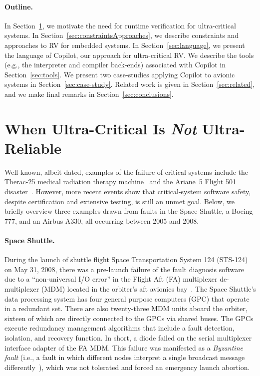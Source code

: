 \paragraph{Outline.}  In Section~\ref{sec:motivation}, we motivate the need for
runtime verification for ultra-critical systems.  In
Section~\ref{sec:constraintsApproaches}, we describe constraints and approaches
to RV for embedded systems.  In Section~\ref{sec:language}, we present the
language of Copilot, our approach for ultra-critical RV.  We describe the tools
(e.g., the interpreter and compiler back-ends) associated with Copilot in
Section~\ref{sec:tools}.  We present two case-studies applying Copilot to
avionic systems in Section~\ref{sec:case-study}.  Related work is given in
Section~\ref{sec:related}, and we make final remarks in
Section~\ref{sec:conclusions}.

\section{When Ultra-Critical Is \emph{Not} Ultra-Reliable}\label{sec:motivation}

Well-known, albeit dated, examples of the failure of critical systems include the
Therac-25 medical radiation therapy machine~\cite{therac} and the Ariane~5
Flight 501 disaster~\cite{ariane}.  However, more recent events show that
critical-system software safety, despite certification and extensive testing, is still an
unmet goal.  Below, we briefly overview three examples drawn from
faults in the Space Shuttle, a Boeing 777, and an Airbus A330, all occurring
between 2005 and 2008.

\paragraph{Space Shuttle.}
During the launch of shuttle flight Space Transportation System 124 (STS-124) on
May 31, 2008, there was a pre-launch failure of the fault diagnosis software due
to a ``non-universal I/O error'' in the Flight Aft (FA) multiplexer
de-multiplexer (MDM) located in the orbiter's aft avionics bay~\cite{mdm08}.
The Space Shuttle's data processing system has four general purpose computers
(GPC) that operate in a redundant set.  There are also twenty-three MDM units
aboard the orbiter, sixteen of which are directly connected to the GPCs via
shared buses.  The GPCs execute redundancy management algorithms that include a
fault detection, isolation, and recovery function.  In short, a diode failed on
the serial multiplexer interface adapter of the FA MDM.  This failure was
manifested as a \emph{Byzantine fault} (i.e., a fault in which different nodes
interpret a single broadcast message differently~\cite{lamport95byzantine}), which was not
tolerated and forced an emergency launch abortion.



